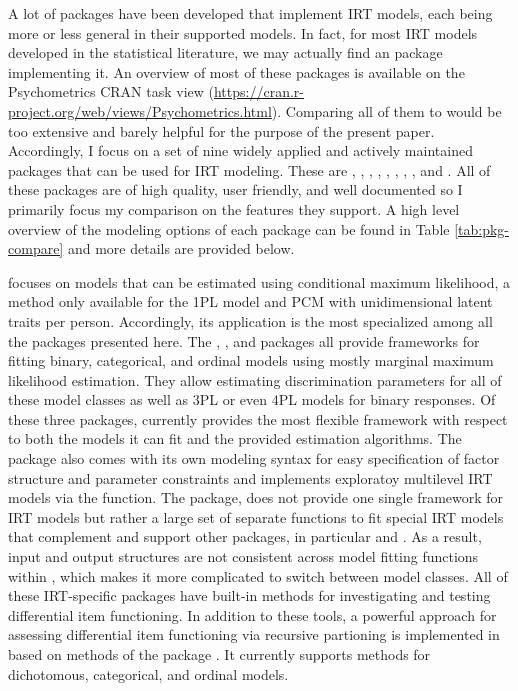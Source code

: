 \documentclass[
]{jss}
\begin{document}
A lot of  packages have been developed that implement IRT
models, each being more or less general in their supported models. In
fact, for most IRT models developed in the statistical literature, we
may actually find an  package implementing it. An overview
of most of these packages is available on the Psychometrics CRAN task
view (\url{https://cran.r-project.org/web/views/Psychometrics.html}).
Comparing all of them to  would be too extensive and barely
helpful for the purpose of the present paper. Accordingly, I focus on a
set of nine widely applied and actively maintained packages that can be
used for IRT modeling. These are  \citep{eRm}, 
\citep{ltm},  \citep{TAM},  \citep{mirt}, 
\citep{sirt},  \citep{lme4},  \citep{lavaan},
 \citep{blavaan}, and  \citep{MCMCglmm}. All
of these packages are of high quality, user friendly, and well
documented so I primarily focus my comparison on the features they
support. A high level overview of the modeling options of each package
can be found in Table \ref{tab:pkg-compare} and more details are
provided below.

 focuses on models that can be estimated using conditional
maximum likelihood, a method only available for the 1PL model and PCM
with unidimensional latent traits per person. Accordingly, its
application is the most specialized among all the packages presented
here. The , , and  packages all provide
frameworks for fitting binary, categorical, and ordinal models using
mostly marginal maximum likelihood estimation. They allow estimating
discrimination parameters for all of these model classes as well as 3PL
or even 4PL models for binary responses. Of these three packages,
 currently provides the most flexible framework with respect
to both the models it can fit and the provided estimation algorithms.
The package also comes with its own modeling syntax for easy
specification of factor structure and parameter constraints and
implements exploratoy multilevel IRT models via the 
function. The  package, does not provide one single framework
for IRT models but rather a large set of separate functions to fit
special IRT models that complement and support other packages, in
particular  and . As a result, input and output
structures are not consistent across model fitting functions within
, which makes it more complicated to switch between model
classes. All of these IRT-specific packages have built-in methods for
investigating and testing differential item functioning. In addition to
these tools, a powerful approach for assessing differential item
functioning via recursive partioning is implemented in 
\citep{psychotree1, psychotree2} based on methods of the
 package \citep{psychotools}. It currently supports
methods for dichotomous, categorical, and ordinal models.
\end{document}
